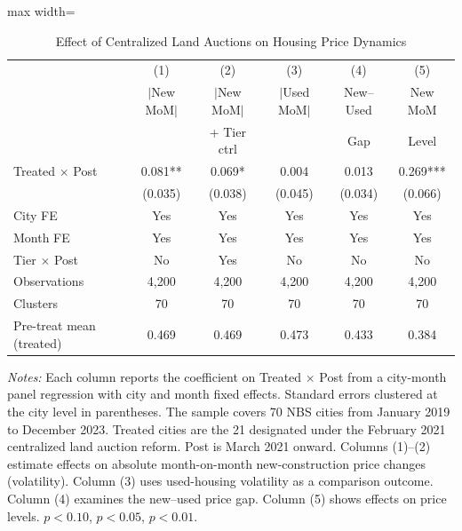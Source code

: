 \begin{table}[H]
\centering
\caption{Effect of Centralized Land Auctions on Housing Price Dynamics}
\label{tab:main}
\begin{threeparttable}
\begin{adjustbox}{max width=\textwidth}
\begin{tabular}{lccccc}
\toprule
 & (1) & (2) & (3) & (4) & (5) \\
 & $|$New MoM$|$ & $|$New MoM$|$ & $|$Used MoM$|$ & New--Used & New MoM \\
 & & + Tier ctrl & & Gap & Level \\
\midrule
Treated $\times$ Post & 0.081** & 0.069* & 0.004 & 0.013 & 0.269*** \\
 & (0.035) & (0.038) & (0.045) & (0.034) & (0.066) \\
\midrule
City FE & Yes & Yes & Yes & Yes & Yes \\
Month FE & Yes & Yes & Yes & Yes & Yes \\
Tier $\times$ Post & No & Yes & No & No & No \\
Observations & 4,200 & 4,200 & 4,200 & 4,200 & 4,200 \\
Clusters & 70 & 70 & 70 & 70 & 70 \\
Pre-treat mean (treated) & 0.469 & 0.469 & 0.473 & 0.433 & 0.384 \\
\bottomrule
\end{tabular}
\end{adjustbox}
\par\vspace{0.3em}
{\footnotesize \textit{Notes:} Each column reports the coefficient on Treated $\times$ Post from a city-month panel regression with city and month fixed effects. Standard errors clustered at the city level in parentheses. The sample covers 70 NBS cities from January 2019 to December 2023. Treated cities are the 21 designated under the February 2021 centralized land auction reform. Post is March 2021 onward. Columns (1)--(2) estimate effects on absolute month-on-month new-construction price changes (volatility). Column (3) uses used-housing volatility as a comparison outcome. Column (4) examines the new--used price gap. Column (5) shows effects on price levels. \sym{*} $p<0.10$, \sym{**} $p<0.05$, \sym{***} $p<0.01$.}
\end{threeparttable}
\end{table}

